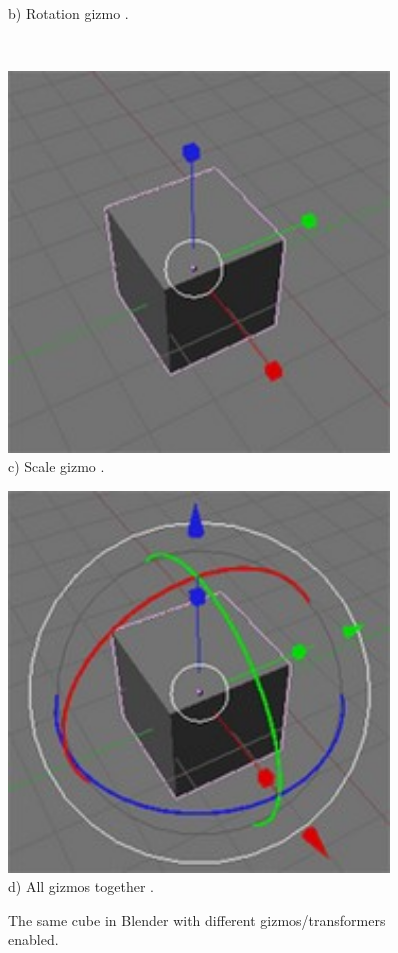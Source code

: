 \begin{figure}[htbp]
\begin{minipage}{.5\textwidth}
  	b) Rotation gizmo \cite{blenderwiki}.
  \end{minipage}\\
  \begin{minipage}{.5\textwidth}
    \centering
    \includegraphics[width=0.9\textwidth]{../assets/Manual-Manipulators-Scale.jpg}\\
  	c) Scale gizmo \cite{blenderwiki}.
  \end{minipage}
  \begin{minipage}{.5\textwidth}
    \centering
    \includegraphics[width=0.9\textwidth]{../assets/Manual-Manipulators-Combo.jpg}\\
  	d) All gizmos together \cite{blenderwiki}.
  \end{minipage}
  \caption{The same cube in Blender with different gizmos/transformers enabled.}
  \label{blender}
\end{figure}
